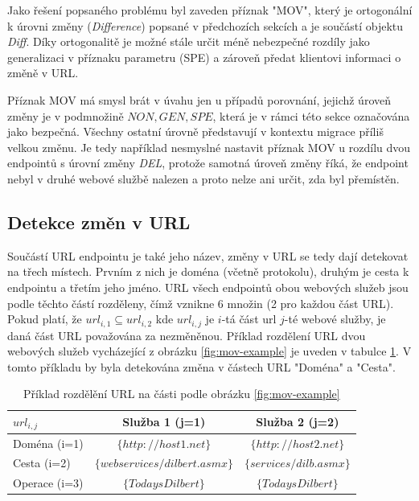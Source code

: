 \documentclass[czech,DP]{thesiskiv}
\begin{document}
Jako řešení popsaného problému byl zaveden příznak "MOV", který je ortogonální k úrovni změny (\textit{Difference}) popsané v předchozích sekcích a je součástí objektu \textit{Diff}. Díky ortogonalitě je možné stále určit méně nebezpečné rozdíly jako generalizaci v příznaku parametru (SPE) a zároveň předat klientovi informaci o změně v URL. 

Příznak MOV má smysl brát v úvahu jen u případů porovnání, jejichž úroveň změny je v podmnožině ${NON, GEN, SPE}$, která je v rámci této sekce označována jako bezpečná. Všechny ostatní úrovně představují v kontextu migrace příliš velkou změnu. Je tedy  například nesmyslné nastavit příznak MOV u rozdílu dvou endpointů s úrovní změny \textit{DEL}, protože samotná úroveň změny říká, že endpoint nebyl v druhé webové službě nalezen a proto nelze ani určit, zda byl přemístěn.  

\subsection{Detekce změn v URL}

Součástí URL endpointu je také jeho název, změny v URL se tedy dají detekovat na třech místech. Prvním z nich je doména (včetně protokolu), druhým je cesta k endpointu a třetím jeho jméno. URL všech endpointů obou webových služeb jsou podle těchto částí rozděleny, čímž vznikne 6 množin (2 pro každou část URL). Pokud platí, že $url_{i,1} \subseteq url_{i,2}$ kde $url_{i,j}$ je $i$-tá část url $j$-té webové služby, je daná část URL považována za nezměněnou. Příklad rozdělení URL dvou webových služeb vycházející z obrázku \ref{fig:mov-example} je uveden v tabulce \ref{tab:url-diff-example}. V tomto příkladu by byla detekována změna v částech URL "Doména" a "Cesta".

\begin{table}[h]
	\begin{tabular}{|l|c|c|}
		\hline
		$url_{i,j}$ & Služba 1 (j=1) & Služba 2 (j=2) \\
		\hline
		\hline
		Doména (i=1) & $\{http://host1.net\}$ & $\{http://host2.net\}$ \\
		\hline
		Cesta (i=2) & $\{webservices/dilbert.asmx\}$ &  $\{services/dilb.asmx\}$ \\
		\hline
		Operace (i=3) & $\{TodaysDilbert\}$ & $\{TodaysDilbert\}$ \\
		\hline
	\end{tabular}
	\caption{Příklad rozdělění URL na části podle obrázku \ref{fig:mov-example}}
	\label{tab:url-diff-example}
\end{table}
  
\end{document}
